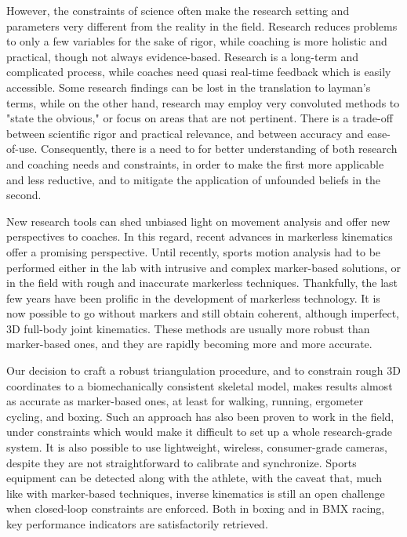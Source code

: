 However, the constraints of science often make the research setting and parameters very different from the reality in the field. 
Research reduces problems to only a few variables for the sake of rigor, while coaching is more holistic and practical, though not always evidence-based. 
Research is a long-term and complicated process, while coaches need quasi real-time feedback which is easily accessible. 
Some research findings can be lost in the translation to layman's terms, while on the other hand, research may employ very convoluted methods to "state the obvious," or focus on areas that are not pertinent. 
There is a trade-off between scientific rigor and practical relevance, and between accuracy and ease-of-use. 
Consequently, there is a need to for better understanding of both research and coaching needs and constraints, in order to make the first more applicable and less reductive, and to mitigate the application of unfounded beliefs in the second.

New research tools can shed unbiased light on movement analysis and offer new perspectives to coaches. In this regard, recent advances in markerless kinematics offer a promising perspective. Until recently, sports motion analysis had to be performed either in the lab with intrusive and complex marker-based solutions, or in the field with rough and inaccurate markerless techniques. Thankfully, the last few years have been prolific in the development of markerless technology. It is now possible to go without markers and still obtain coherent, although imperfect, 3D full-body joint kinematics. These methods are usually more robust than marker-based ones, and they are rapidly becoming more and more accurate. 

Our decision to craft a robust triangulation procedure, and to constrain rough 3D coordinates to a biomechanically consistent skeletal model, makes results almost as accurate as marker-based ones, at least for walking, running, ergometer cycling, and boxing. Such an approach has also been proven to work in the field, under constraints which would make it difficult to set up a whole research-grade system. It is also possible to use lightweight, wireless, consumer-grade cameras, despite they are not straightforward to calibrate and synchronize. Sports equipment can be detected along with the athlete, with the caveat that, much like with marker-based techniques, inverse kinematics is still an open challenge when closed-loop constraints are enforced. Both in boxing and in BMX racing, key performance indicators are satisfactorily retrieved. 

